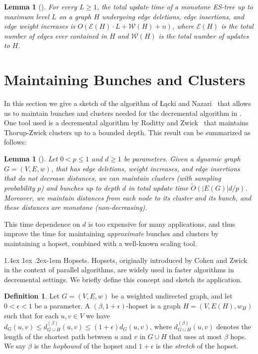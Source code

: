 \documentclass[11pt]{article}
\makeatletter
\newtheorem{lemma}[theorem]{Lemma}
\theoremstyle{definition}
\newtheorem{definition}{Definition}
\theoremstyle{remark}
\renewcommand{\paragraph}{%
  \@startsection{paragraph}{4}%
  {\z@}{1.4ex \@plus 1ex \@minus .2ex}{-1em}%
  {\normalfont\normalsize\bfseries}%
}
\makeatother
\begin{document}
\begin{titlepage}
{\begin{lemma}[\cite{HKN2016}]\label{lm:ES-tree}
    For every $L \geq 1$, the total update time of a monotone ES-tree up to maximum level $L$ on a graph $H$ undergoing edge deletions, edge insertions, and edge weight increases is $O(\mathcal E(H)\cdot L+\mathcal W(H)+n)$, where $\mathcal E(H)$ is the total number of edges ever contained in $H$ and $\mathcal W(H)$ is the total number of updates to $H$.
\end{lemma}
}

\section{Maintaining Bunches and Clusters}\label{ap:bunches_and_clusters}
In this section we give a sketch of the algorithm of {\L}ącki and Nazari~\cite{LN2020} that allows us to maintain bunches and clusters needed for the decremental algorithm in . 
One tool used is a decremental algorithm by Roditty and Zwick~\cite{RZ12} that maintains Thorup-Zwick clusters up to a bounded depth. This result can be summarized as follows:

\begin{lemma}[\cite{RZ12}]\label{lem:rz}
Let $0<p\leq 1$ and $d\geq 1$ be parameters. Given a dynamic graph $G=(V,E,w)$, that has edge deletions, weight increases, and edge insertions that do not decrease distances, we can maintain clusters (with sampling probability $p$) and bunches up to depth $d$ in total update time $\tilde O(|E(G)|d/p)$. Moreover, we maintain distances from each node to its cluster and its bunch, and these distances are monotone (non-decreasing).
\end{lemma}

This time dependence on $d$ is too expensive for many applications, and thus \cite{LN2020} improve the time for maintaining \textit{approximate} bunches and clusters by maintaining a hopset, combined with a well-known scaling tool. 

\paragraph{Hopsets.}
Hopsets, originally introduced by Cohen and Zwick~\cite{CohenZ01} in the context of parallel algorithms, are widely used in faster algorithms in decremental settings. We briefly define this concept and sketch its application. 
\begin{definition}
Let $G=(V,E,w)$ be a weighted undirected graph, and let $0<\epsilon <1$ be a parameter. A $(\beta,1+\epsilon)$-hopset is a graph $H=(V,E(H),w_H)$ such that for each $u,v\in V$ we have $d_G(u,v)\leq d^{(\beta)}_{G\cup H}(u,v) \leq (1+\epsilon) d_G(u,v)$, where $d^{(\beta)}_{G\cup H}(u,v)$ denotes the length of the shortest path between $u$ and $v$ in $G\cup H$ that uses at most $\beta$ hops. We say $\beta$ is the \emph{hopbound} of the hopset and $1+\epsilon$ is the \emph{stretch} of the hopset. 
\end{definition}



\end{titlepage}
\end{document}
